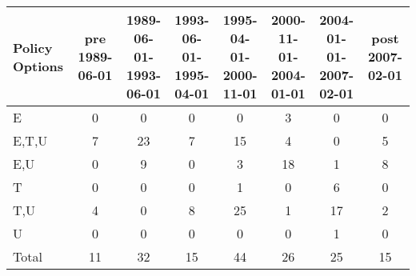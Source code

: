 \begin{tabular}{lccccccc}
\hline\hline 
\addlinespace 
Policy Options & pre 1989-06-01 & \shortstack{1989-06-01- \\ 1993-06-01} & \shortstack{1993-06-01- \\ 1995-04-01} & \shortstack{1995-04-01- \\ 2000-11-01} & \shortstack{2000-11-01- \\ 2004-01-01} & \shortstack{2004-01-01- \\ 2007-02-01} & post 2007-02-01 \\ 
\hline 
E & 0 & 0 & 0 & 0 & 3 & 0 & 0 \\
E,T,U & 7 & 23 & 7 & 15 & 4 & 0 & 5 \\
E,U & 0 & 9 & 0 & 3 & 18 & 1 & 8 \\
T & 0 & 0 & 0 & 1 & 0 & 6 & 0 \\
T,U & 4 & 0 & 8 & 25 & 1 & 17 & 2 \\
U & 0 & 0 & 0 & 0 & 0 & 1 & 0 \\
\addlinespace 
Total & 11 & 32 & 15 & 44 & 26 & 25 & 15 \\
\hline 
\end{tabular}
